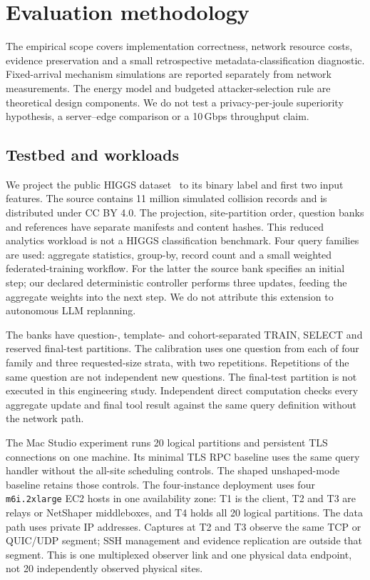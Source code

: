 \section{Evaluation methodology}\label{sec:eval}

The empirical scope covers implementation correctness, network resource costs, evidence preservation and a small retrospective metadata-classification diagnostic. Fixed-arrival mechanism simulations are reported separately from network measurements. The energy model and budgeted attacker-selection rule are theoretical design components. We do not test a privacy-per-joule superiority hypothesis, a server--edge comparison or a 10\,Gbps throughput claim.

\subsection{Testbed and workloads}\label{sec:testbed}
We project the public HIGGS dataset~\cite{whiteson2014higgs} to its binary label and first two input features. The source contains 11 million simulated collision records and is distributed under CC BY 4.0. The projection, site-partition order, question banks and references have separate manifests and content hashes. This reduced analytics workload is not a HIGGS classification benchmark. Four query families are used: aggregate statistics, group-by, record count and a small weighted federated-training workflow. For the latter the source bank specifies an initial step; our declared deterministic controller performs three updates, feeding the aggregate weights into the next step. We do not attribute this extension to autonomous LLM replanning.

The banks have question-, template- and cohort-separated TRAIN, SELECT and reserved final-test partitions. The calibration uses one question from each of four family and three requested-size strata, with two repetitions. Repetitions of the same question are not independent new questions. The final-test partition is not executed in this engineering study. Independent direct computation checks every aggregate update and final tool result against the same query definition without the network path.

The Mac Studio experiment runs 20 logical partitions and persistent TLS connections on one machine. Its minimal TLS RPC baseline uses the same query handler without the all-site scheduling controls. The shaped unshaped-mode baseline retains those controls. The four-instance deployment uses four \nolinkurl{m6i.2xlarge} EC2 hosts in one availability zone: T1 is the client, T2 and T3 are relays or NetShaper middleboxes, and T4 holds all 20 logical partitions. The data path uses private IP addresses. Captures at T2 and T3 observe the same TCP or QUIC/UDP segment; SSH management and evidence replication are outside that segment. This is one multiplexed observer link and one physical data endpoint, not 20 independently observed physical sites.

